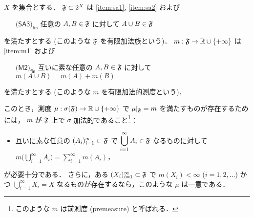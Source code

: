 \begin{theorem}\label{thm:Hopf_extension}
    \leavevmode\par
    $X$ を集合とする．
    $\mathfrak{F}\subset2^X$ は \ref{item:sa1}, \ref{item:sa2} および
    \begin{enumerate}[align=left]
        \item[$\textsf{(SA3)}_\textsf{fin}$] 任意の $A,B\in\mathfrak{F}$ に対して $A\cup B\in\mathfrak{F}$
    \end{enumerate}
    を満たすとする (このような $\mathfrak{F}$ を有限加法族という)．
    $m:\mathfrak{F}\to\mathbb{R}\cup\{+\infty\}$ は \ref{item:m1} および
    \begin{enumerate}[align=left]
        \item[$\textsf{(M2)}_\textsf{fin}$] 互いに素な任意の $A,B\in\mathfrak{F}$ に対して $m(A\cup B)=m(A)+m(B)$
    \end{enumerate}
    を満たすとする (このような $m$ を有限加法的測度という)．

    このとき，測度 $\mu:\sigma(\mathfrak{F})\to\mathbb{R}\cup\{+\infty\}$ で $\mu\vert_{\mathfrak{F}}=m$ を満たすものが存在するためには，
    $m$ が $\mathfrak{F}$ 上で $\sigma$-加法的であること\footnote{このような $m$ は前測度 (premeasure) と呼ばれる．}：
    \begin{itemize}
        \item 互いに素な任意の $(A_i)_{i=1}^\infty\subset\mathfrak{F}$ で
            $\displaystyle\bigcup_{i=1}^\infty A_i\in\mathfrak{F}$ なるものに対して
            $\displaystyle m\biggl(\bigcup_{i=1}^\infty A_i\biggr)=\sum_{i=1}^\infty m(A_i)$，
    \end{itemize}
    が必要十分である．
    さらに，ある $(X_i)_{i=1}^\infty\subset\mathfrak{F}$ で
    $m(X_i)<\infty$ ($i=1,2,\ldots$) かつ $\displaystyle\bigcup_{i=1}^\infty X_i=X$
    なるものが存在するなら，このような $\mu$ は一意である．
\end{theorem}

